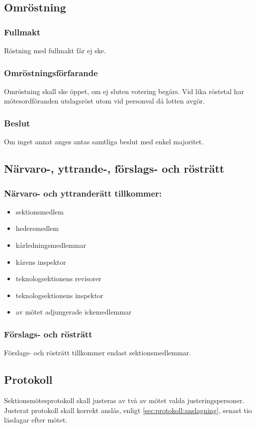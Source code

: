 \subsection{Omröstning}

\subsubsection{Fullmakt}
Röstning med fullmakt får ej ske.

\subsubsection{Omröstningsförfarande}
Omröstning skall ske öppet, om ej sluten votering begärs. Vid lika röstetal har mötesordföranden utslagsröst utom vid personval då lotten avgör.

\subsubsection{Beslut}
Om inget annat anges antas samtliga beslut med enkel majoritet.

\subsection{Närvaro-, yttrande-, förslags- och rösträtt}

\subsubsection{Närvaro- och yttranderätt tillkommer:}
\begin{itemize}
	\item sektionsmedlem
	\item hedersmedlem
	\item kårledningsmedlemmar
	\item kårens inspektor
	\item teknologsektionens revisorer
	\item teknologsektionens inspektor
	\item av mötet adjungerade ickemedlemmar
\end{itemize}

\subsubsection{Förslags- och rösträtt}
Förslags- och rösträtt tillkommer endast sektionsmedlemmar.

\subsection{Protokoll}
Sektionsmötesprotokoll skall justeras av två av mötet valda justeringspersoner. Justerat protokoll skall korrekt anslås, enligt \ref{sec:protokoll:anslagning}, senast tio läsdagar efter mötet.
